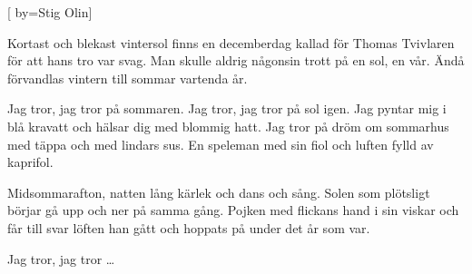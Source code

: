 


[ 	%
	by={Stig Olin}]		%

\beginverse*		%
Kortast och blekast vintersol
finns en decemberdag
kallad för Thomas Tvivlaren
för att hans tro var svag.
Man skulle aldrig någonsin
trott på en sol, en vår.
Ändå förvandlas vintern till 
sommar vartenda år.
\endverse			%

\beginchorus
Jag tror, jag tror på sommaren.
Jag tror, jag tror på sol igen.
Jag pyntar mig i blå kravatt
och hälsar dig med blommig hatt.
Jag tror på dröm om sommarhus
med täppa och med lindars sus.
En speleman med sin fiol
och luften fylld av kaprifol.
\endchorus

\beginverse*		%
Midsommarafton, natten lång
kärlek och dans och sång.
Solen som plötsligt börjar gå
upp och ner på samma gång.
Pojken med flickans hand i sin
viskar och får till svar
löften han gått och hoppats på 
under det år som var.
\endverse			%

\beginchorus
Jag tror, jag tror …
\endchorus
\endsong			%
